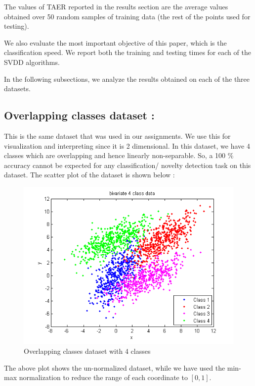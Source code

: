 \documentclass{article} %
\begin{document}
The values of TAER reported in the results section are the average values obtained over 50 random samples of training data (the rest of the points used for testing). 

We also evaluate the most important objective of this paper, which is the classification speed. We report both the training and testing times for each of the SVDD algorithms.

In the following subsections, we analyze the results obtained on each of the three datasets. \\[10pt]



\subsection{Overlapping classes dataset :} This is the same dataset that was used in our assignments. We use this for visualization and interpreting since it is 2 dimensional. In this dataset, we have 4 classes which are overlapping and hence linearly non-separable. So, a 100 \% accuracy cannot be expected for any classification/ novelty detection task on this dataset.
The scatter plot of the dataset is shown below :

\begin{figure}
  \centering
  \includegraphics[width=\linewidth]{../Code/overlapping/svdd/data}
  \caption{Overlapping classes dataset with 4 classes}
\end{figure}

The above plot shows the un-normalized dataset, while we have used the min-max normalization to reduce the  range of each coordinate to $[0,1]$. 
\end{document}

